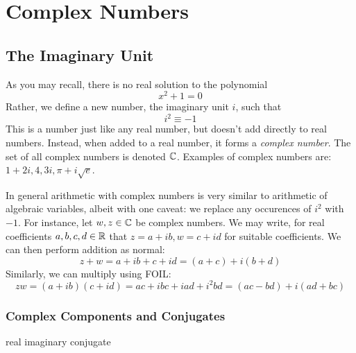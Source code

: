 \chapter{Complex Numbers}
\section{The Imaginary Unit}
As you may recall, there is no real solution to the polynomial 
\[x^2+1=0\]
Rather, we define a new number, the imaginary unit \(i\), such that
\[i^2\equiv-1\]
This is a number just like any real number, but doesn't add directly to real numbers. Instead, when added to a real number, it forms a \emph{complex number}. The set of all complex numbers is denoted \(\mathbb{C}\). Examples of complex numbers are: \(1+2i, 4, 3i, \pi+i\sqrt{e}\).

In general arithmetic with complex numbers is very similar to arithmetic of algebraic variables, albeit with one caveat: we replace any occurences of \(i^2\) with \(-1\). For instance, let \(w,z\in\mathbb{C}\) be complex numbers. We may write, for real coefficients \(a,b,c,d\in\mathbb{R}\) that \(z=a+ib, w= c+id\) for suitable coefficients. We can then perform addition as normal:
\[z+w = a+ib + c+id = (a+c) + i(b+d)\]
Similarly, we can multiply using FOIL:\@
\[zw = (a+ib)(c+id) = ac + ibc + iad + i^2bd = (ac-bd) +i(ad+bc)\]

\subsection{Complex Components and Conjugates}
real
imaginary
conjugate


